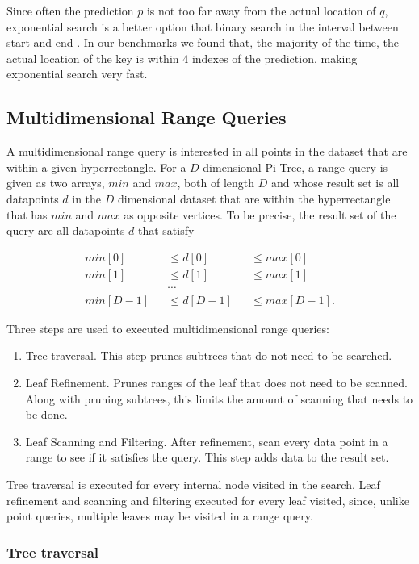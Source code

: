 \documentclass[sigconf,10pt]{acmart}
\begin{document}
Since often the prediction $p$ is not too far away from the actual location
of $q$, exponential search is a better option that binary search in the interval
between start and end \cite{ALEX}.
In our benchmarks we found that, the majority of the time,
the actual location of the key is within $4$ indexes of the prediction,
making exponential search very fast. 


\subsection{Multidimensional Range Queries}

A multidimensional range query is interested in all points in the 
dataset that are within a given hyperrectangle. For a $D$ dimensional Pi-Tree,
a range query is given as two arrays, $min$ and $max$, both of length $D$
and whose result set is all datapoints $d$ in the $D$ dimensional dataset 
that are within the hyperrectangle that has $min$ and $max$ as opposite vertices.
To be precise, the result set of the query are all datapoints $d$
that satisfy

\begin{align*}
  min[0] && \leq d[0] && \leq max[0] \\
  min[1] && \leq d[1] && \leq max[1] \\
  && \cdots && \\
  min[D-1] && \leq d[D-1] && \leq max[D-1].
\end{align*}

Three steps are used to executed multidimensional range queries:
\begin{enumerate}
  \item Tree traversal. This step prunes subtrees that do not need to be searched.
  \item Leaf Refinement. Prunes ranges of the leaf that does not need to be scanned.
  Along with pruning subtrees, this limits the amount of scanning that needs to be done.
  \item Leaf Scanning and Filtering. After refinement, scan every data point in
  a range to see if it satisfies the query. This step adds 
  data to the result set.
\end{enumerate}

Tree traversal is executed for every internal node visited in the search.
Leaf refinement and scanning and filtering executed for every leaf visited, since, unlike
point queries, multiple leaves may be visited in a range query.

\subsubsection{Tree traversal}
\end{document}
